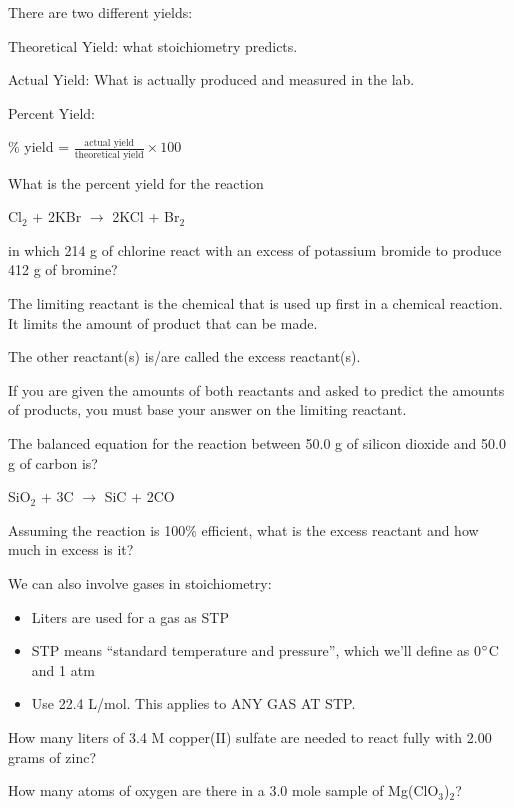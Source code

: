 \documentclass[../hchem.tex]{subfiles}
\begin{document}
There are two different yields:

Theoretical Yield: what stoichiometry predicts.

Actual Yield: What is actually produced and measured in the lab.

Percent Yield:
\begin{center}
    \% yield = $\frac{\text{actual yield}}{\text{theoretical yield}}\times 100$
\end{center}

\ex What is the percent yield for the reaction 
\begin{center}
    Cl$_2$ + 2KBr $\rightarrow$ 2KCl + Br$_2$
\end{center}
in which 214 g of chlorine react with an excess of potassium bromide to produce 412 g of bromine? 

The limiting reactant is the chemical that is used up first in a chemical reaction. It limits the amount of product that can be made.

The other reactant(s) is/are called the excess reactant(s).

If you are given the amounts of both reactants and asked to predict the amounts of products, you must base your answer on the limiting reactant.

\ex The balanced equation for the reaction between 50.0 g of silicon dioxide and 50.0 g of carbon is?
\begin{center}
    SiO$_2$ + 3C $\rightarrow$ SiC + 2CO
\end{center}
Assuming the reaction is 100\% efficient, what is the excess reactant and how much in excess is it? 

We can also involve gases in stoichiometry:
\begin{itemize}
    \item Liters are used for a gas as STP 
    \item STP means ``standard temperature and pressure'', which we'll define as 0$\degree$C and 1 atm 
    \item Use 22.4 L/mol. This applies to ANY GAS AT STP.
\end{itemize}

\ex How many liters of 3.4 M copper(II) sulfate are needed to react fully with 2.00 grams of zinc?

\ex How many atoms of oxygen are there in a 3.0 mole sample of Mg(ClO$_3$)$_2$? 
\end{document}
